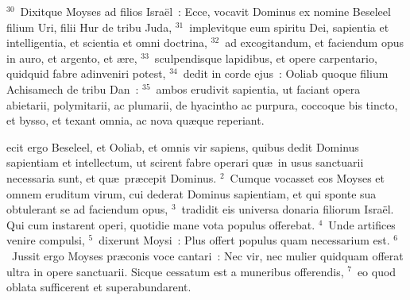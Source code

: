 ${}^{30}$~Dixitque Moyses ad filios Isra\"el~: Ecce, vocavit Dominus ex nomine Beseleel filium Uri, filii Hur de tribu Juda,
${}^{31}$~implevitque eum spiritu Dei, sapientia et intelligentia, et scientia et omni doctrina,
${}^{32}$~ad excogitandum, et faciendum opus in auro, et argento, et \ae re,
${}^{33}$~sculpendisque lapidibus, et opere carpentario, quidquid fabre adinveniri potest,
${}^{34}$~dedit in corde ejus~: Ooliab quoque filium Achisamech de tribu Dan~:
${}^{35}$~ambos erudivit sapientia, ut faciant opera abietarii, polymitarii, ac plumarii, de hyacintho ac purpura, coccoque bis tincto, et bysso, et texant omnia, ac nova qu\ae que reperiant.

\bchapter
{}ecit ergo Beseleel, et Ooliab, et omnis vir sapiens, quibus dedit Dominus sapientiam et intellectum, ut scirent fabre operari qu\ae\ in usus sanctuarii necessaria sunt, et qu\ae\ pr\ae cepit Dominus.
${}^{2}$~Cumque vocasset eos Moyses et omnem eruditum virum, cui dederat Dominus sapientiam, et qui sponte sua obtulerant se ad faciendum opus,
${}^{3}$~tradidit eis universa donaria filiorum Isra\"el. Qui cum instarent operi, quotidie mane vota populus offerebat.
${}^{4}$~Unde artifices venire compulsi,
${}^{5}$~dixerunt Moysi~: Plus offert populus quam necessarium est.
${}^{6}$~Jussit ergo Moyses pr\ae conis voce cantari~: Nec vir, nec mulier quidquam offerat ultra in opere sanctuarii. Sicque cessatum est a muneribus offerendis,
${}^{7}$~eo quod oblata sufficerent et superabundarent.


